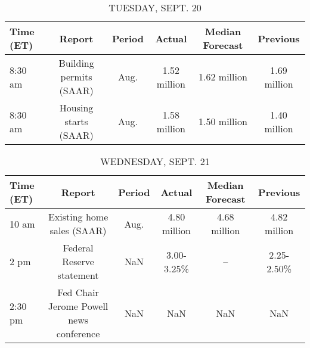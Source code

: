 \documentclass{book}
\begin{document}
  
  
  \begin{table}[htbp]%
  \caption{TUESDAY, SEPT. 20}%
  \centering%
  \begin{adjustbox}{width=1\textwidth}%
  \begin{tabular}{lccccc}
  \toprule
  Time (ET) &                  Report & Period &       Actual & Median Forecast &     Previous \\
  \midrule
    8:30 am & Building permits (SAAR) &   Aug. & 1.52 million &    1.62 million & 1.69 million \\
    8:30 am &   Housing starts (SAAR) &   Aug. & 1.58 million &    1.50 million & 1.40 million \\
  \bottomrule
  \end{tabular}
  \end{adjustbox}%
  \end{table}
  
  
  
  \begin{table}[htbp]%
  \caption{WEDNESDAY, SEPT. 21}%
  \centering%
  \begin{adjustbox}{width=1\textwidth}%
  \begin{tabular}{lccccc}
  \toprule
  Time (ET) &                                  Report & Period &       Actual & Median Forecast &     Previous \\
  \midrule
      10 am &              Existing home sales (SAAR) &   Aug. & 4.80 million &    4.68 million & 4.82 million \\
       2 pm &               Federal Reserve statement &    NaN &   3.00-3.25\% &              -- &   2.25-2.50\% \\
    2:30 pm & Fed Chair Jerome Powell news conference &    NaN &          NaN &             NaN &          NaN \\
  \bottomrule
  \end{tabular}
  \end{adjustbox}%
  \end{table}
  
  
\end{document}

